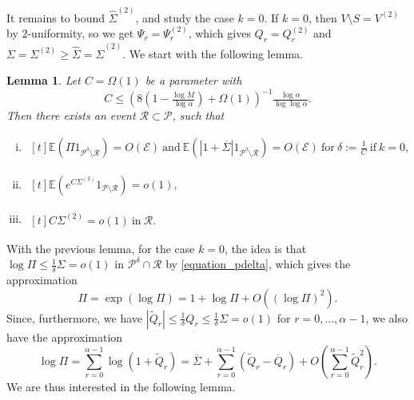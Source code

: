 \documentclass{article}
\theoremstyle{plain}
\theoremstyle{remark}
\theoremstyle{plain}
\newtheorem{lemma}[theorem]{Lemma}
\numberwithin{equation}{section}
\begin{document}
	It remains to bound $\hat{\Sigma}^{(2)}$, and study the case $k=0$. If $k=0$, then $V\setminus S=V^{(2)}$ by $2$-uniformity, so we get $\Psi_r=\Psi_r^{(2)}$, which gives $Q_r=Q_r^{(2)}$ and $\Sigma=\Sigma^{(2)}\geq\hat{\Sigma}=\hat{\Sigma}^{(2)}$. We start with the following lemma.
	
	\begin{lemma}\label{lemma_sigma2}
		Let $C=\Omega(1)$ be a parameter with $$C\leq\left(8\left(1-\tfrac{\log M}{\log\alpha}\right)+\Omega(1)\right)^{-1}\tfrac{\log\alpha}{\log\log\alpha}.$$ Then there exists an event $\mathcal{R}\subset\mathcal{P}$, such that
		\begin{enumerate}[(i)]
			\item\label{lemma_sigma2_pi} $\begin{aligned}[t]
				\mathbb{E}(\Pi1_{\mathcal{P}^{\delta}\setminus\mathcal{R}})=O(\mathscr{E})\ \text{and}\ \mathbb{E}(|1+\overline{\Sigma}|1_{\mathcal{P}^{\delta}\setminus\mathcal{R}})=O(\mathscr{E})\ \text{for}\ \delta:=\tfrac1{C}\ \text{if}\ k=0,
			\end{aligned}$
			\item\label{lemma_sigma2_exp} $\begin{aligned}[t]
				\mathbb{E}(e^{C\Sigma^{(2)}}1_{\mathcal{P}\setminus\mathcal{R}})=o(1),
			\end{aligned}$
			\item\label{lemma_sigma2_out} $\begin{aligned}[t]
				C\Sigma^{(2)}=o(1)\ \text{in}\ \mathcal{R}.
			\end{aligned}$
		\end{enumerate}
	\end{lemma}
	
	With the previous lemma, for the case $k=0$, the idea is that $\log\Pi\leq\tfrac1{\delta}\Sigma=o(1)$ in $\mathcal{P}^{\delta}\cap\mathcal{R}$ by \eqref{equation_pdelta}, which gives the approximation $$\Pi=\exp(\log\Pi)=1+\log\Pi+O((\log\Pi)^2).$$ Since, furthermore, we have $|\widetilde{Q}_r|\leq\tfrac1{\delta}Q_r\leq\tfrac1{\delta}\Sigma=o(1)$ for $r=0,\ldots,\alpha-1$, we also have the approximation $$\log\Pi=\sum_{r=0}^{\alpha-1}\log(1+\widetilde{Q}_r)=\overline{\Sigma}+\sum_{r=0}^{\alpha-1}(\widetilde{Q}_r-\overline{Q}_r)+O\left(\sum_{r=0}^{\alpha-1}\widetilde{Q}_r^2\right).$$ We are thus interested in the following lemma.
	
\end{document}
